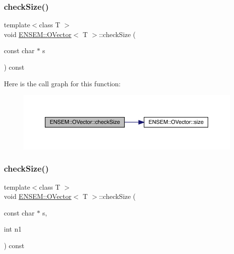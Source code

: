 \subsubsection{\texorpdfstring{checkSize()}{checkSize()}\hspace{0.1cm}{\footnotesize\ttfamily [3/6]}}
{\footnotesize\ttfamily template$<$class T $>$ \\
void \mbox{\hyperlink{classENSEM_1_1OVector}{E\+N\+S\+E\+M\+::\+O\+Vector}}$<$ T $>$\+::check\+Size (\begin{DoxyParamCaption}\item[{const char $\ast$}]{s }\end{DoxyParamCaption}) const\hspace{0.3cm}{\ttfamily [inline]}}

Here is the call graph for this function\+:
\nopagebreak
\begin{figure}[H]
\begin{center}
\leavevmode
\includegraphics[width=350pt]{d0/d8d/classENSEM_1_1OVector_a12d09a71bb2808a7404578da9ba41c4f_cgraph}
\end{center}
\end{figure}
\mbox{\label{classENSEM_1_1OVector_a1446ad09778db3a287fb5f6fec304b22}} 
\subsubsection{\texorpdfstring{checkSize()}{checkSize()}\hspace{0.1cm}{\footnotesize\ttfamily [4/6]}}
{\footnotesize\ttfamily template$<$class T $>$ \\
void \mbox{\hyperlink{classENSEM_1_1OVector}{E\+N\+S\+E\+M\+::\+O\+Vector}}$<$ T $>$\+::check\+Size (\begin{DoxyParamCaption}\item[{const char $\ast$}]{s,  }\item[{int}]{n1 }\end{DoxyParamCaption}) const\hspace{0.3cm}{\ttfamily [inline]}}


